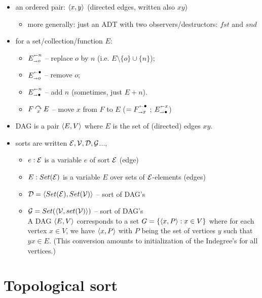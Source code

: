 \documentclass[leqno]{article}
\newcommand{\srt}[1]{{\cal #1}}
\begin{document}
\begin{itemize}
\item an ordered pair: $\langle x,y\rangle$ (directed edges, written also $xy$)
 \begin{itemize}
 \item more generally: just an ADT with two observers/destructors: $fst$ and $snd$
 \end{itemize}
\item for a set/collection/function $E$: 
 \begin{itemize}
  \item  $\upd Eon$ -- replace $o$ by $n$ (i.e. $E\setminus\{o\}\cup\{n\}$);
  \item $\rem Eo$ -- remove $o$;
  \item $\add En$ -- add $n$ (sometimes, just $E+n$).
  \item $\mv FEx$ -- move $x$ from $F$ to $E$ ($=\rem Fx$ ; $\add Ex$)
 \end{itemize}
\item DAG is a pair $\langle E,V\rangle$ where $E$ is the set of (directed) edges $xy$.
\item sorts are written $\srt E,\srt V, \srt D, \srt G$..., 
 \begin{itemize}
 \item $e:\srt E$ is a variable $e$ of sort $\srt E$ (edge)
 \item $E:Set(\srt E)$ is a variable $E$ over sets of $\srt E$-elements (edges)
 \item $\srt D = \<Set(\srt E),Set(\srt V)\>$ -- sort of DAG's 
 \item $\srt G = Set(\<\srt V,set(\srt V)\>)$ -- sort of DAG's \\
 A DAG $\langle E,V\rangle$ corresponds to a set $G=\{\langle x,P\rangle:x\in V\}$ where for each 
vertex $x\in V$, we have $\langle x,P\rangle$ with 
$P$ being the set of vertices $y$ such that $yx\in E$.
(This conversion amounts to initialization of the Indegree's for all vertices.)
 \end{itemize}
\end{itemize}

\newpage
\section{Topological sort}
\end{document}

